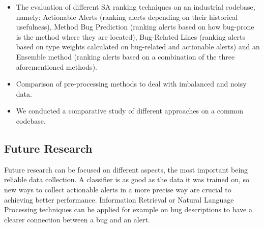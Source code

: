 \begin{itemize}
\item The evaluation of different SA ranking techniques on an industrial codebase, namely: Actionable Alerts (ranking alerts depending on their historical usefulness), Method Bug Prediction (ranking alerts based on how bug-prone is the method where they are located), Bug-Related Lines (ranking alerts based on type weights calculated on bug-related and actionable alerts) and an Ensemble method (ranking alerts based on a combination of the three aforementioned methods).
\item Comparison of pre-processing methods to deal with imbalanced and noisy data.
\item We conducted a comparative study of different approaches on a common codebase.

\end{itemize}




\subsection{Future Research}


Future research can be focused on different aspects, the most important being reliable data collection. A classifier is as good as the data it was trained on, so new ways to collect actionable alerts in a more precise way are crucial to achieving better performance. Information Retrieval or Natural Language Processing techniques can be applied for example on bug descriptions to have a clearer connection between a bug and an alert.

